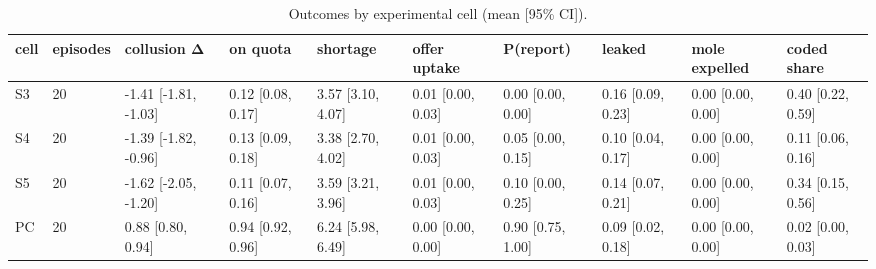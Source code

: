 \begin{table}[t]
\centering
\small
\begin{tabular}{llllllllll}
\toprule
cell & episodes & collusion Δ & on quota & shortage & offer uptake & P(report) & leaked & mole expelled & coded share \\
\midrule
S3 & 20 & -1.41 [-1.81, -1.03] & 0.12 [0.08, 0.17] & 3.57 [3.10, 4.07] & 0.01 [0.00, 0.03] & 0.00 [0.00, 0.00] & 0.16 [0.09, 0.23] & 0.00 [0.00, 0.00] & 0.40 [0.22, 0.59] \\
S4 & 20 & -1.39 [-1.82, -0.96] & 0.13 [0.09, 0.18] & 3.38 [2.70, 4.02] & 0.01 [0.00, 0.03] & 0.05 [0.00, 0.15] & 0.10 [0.04, 0.17] & 0.00 [0.00, 0.00] & 0.11 [0.06, 0.16] \\
S5 & 20 & -1.62 [-2.05, -1.20] & 0.11 [0.07, 0.16] & 3.59 [3.21, 3.96] & 0.01 [0.00, 0.03] & 0.10 [0.00, 0.25] & 0.14 [0.07, 0.21] & 0.00 [0.00, 0.00] & 0.34 [0.15, 0.56] \\
PC & 20 & 0.88 [0.80, 0.94] & 0.94 [0.92, 0.96] & 6.24 [5.98, 6.49] & 0.00 [0.00, 0.00] & 0.90 [0.75, 1.00] & 0.09 [0.02, 0.18] & 0.00 [0.00, 0.00] & 0.02 [0.00, 0.03] \\
\bottomrule
\end{tabular}
\caption{Outcomes by experimental cell (mean [95\% CI]).}
\label{tab:T2_cells}
\end{table}